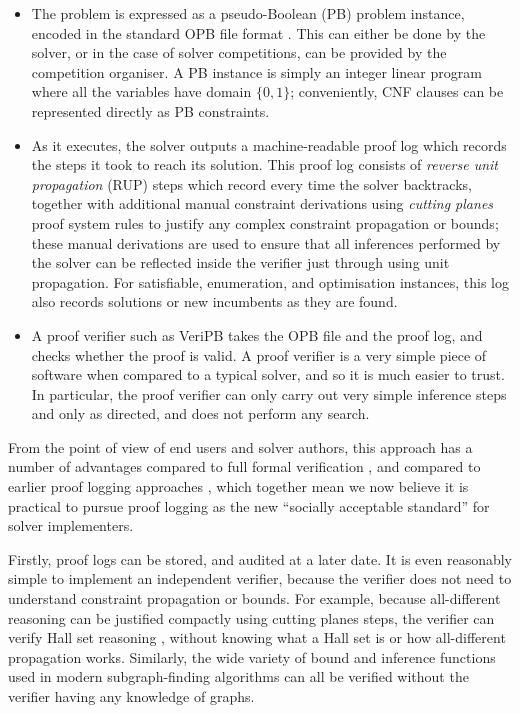 \documentclass[runningheads]{llncs}
\begin{document}
\begin{itemize}
    \item The problem is expressed as a pseudo-Boolean (PB) problem instance, encoded in the
        standard OPB file format \cite{opbformat}.
        This can either be done by the solver, or in the case of solver competitions, can be
        provided by the competition organiser. A PB instance is simply an integer linear program
        where all the variables have domain $\{ 0, 1 \}$; conveniently, CNF clauses can be
        represented directly as PB constraints.
    \item As it executes, the solver outputs a machine-readable proof log which records the steps it
        took to reach its solution. This proof log consists of \emph{reverse unit propagation} (RUP)
        steps \cite{DBLP:conf/aaai/ElffersGMN20,DBLP:conf/isaim/Gelder08} which record every time the solver
        backtracks, together with additional manual constraint derivations using \emph{cutting
        planes} proof system rules \cite{DBLP:journals/dam/CookCT87} to justify any
        complex constraint propagation or bounds; these manual derivations are used to ensure that
        all inferences performed by the solver can be reflected inside the verifier just through using
        unit propagation. For satisfiable, enumeration, and optimisation
        instances, this log also records solutions or new incumbents as they are found.
    \item A proof verifier such as VeriPB takes the OPB file and the proof log, and checks whether
        the proof is valid. A proof verifier is a very simple piece of software when compared to a
        typical solver, and so it is much easier to trust. In particular, the proof verifier can
        only carry out very simple inference steps and only as directed, and does not perform any search.
\end{itemize}

From the point of view of end users and solver authors, this approach has a number of advantages
compared to full formal verification \cite{Dubois20}, and compared to earlier proof logging approaches
\cite{Stuckey19,DBLP:conf/aaai/VekslerS10,DBLP:conf/sat/WetzlerHH14}, which
together mean we now believe it is practical to pursue proof logging as the new ``socially
acceptable standard'' for solver implementers.

Firstly, proof logs can be stored, and audited at a later date. It is even reasonably simple to
implement an independent verifier, because the verifier does not need to understand constraint
propagation or bounds. For example, because all-different reasoning can be justified compactly using
cutting planes steps, the verifier can verify Hall set reasoning \cite{DBLP:conf/aaai/ElffersGMN20},
without knowing what a Hall set is or how all-different propagation works. Similarly, the wide
variety of bound and inference functions used in modern subgraph-finding algorithms
\cite{GochtMMNPT20,DBLP:conf/ijcai/GochtMN20} can all be verified without the verifier having any
knowledge of graphs.
\end{document}
